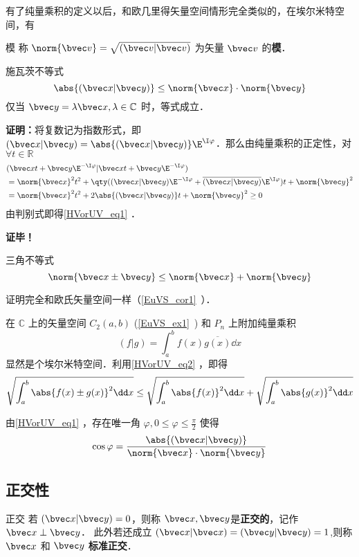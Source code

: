 有了纯量乘积的定义以后，和欧几里得矢量空间情形完全类似的，在埃尔米特空间，有
\begin{definition}{模}
称 $\norm{\bvec v}=\sqrt{(\bvec v|\bvec v)}$ 为矢量 $\bvec v$ 的\textbf{模}．
\end{definition} 
\begin{theorem}{施瓦茨不等式}
\begin{equation}\label{HVorUV_eq1}
\abs{(\bvec x|\bvec y)}\leq \norm{\bvec x}\cdot \norm{\bvec y}
\end{equation}
仅当 $\bvec y=\lambda\bvec x,\lambda\in\mathbb{C}$ 时，等式成立．
\end{theorem}
\textbf{证明：}将复数记为指数形式，即 $(\bvec x|\bvec y)=\abs{(\bvec x|\bvec y)}\E^{\I \varphi}$．那么由纯量乘积的正定性，对 $\forall t\in\mathbb{R}$
\begin{equation}
\begin{aligned}
&(\bvec x t+\bvec y\E^{-\I\varphi}|\bvec x t+\bvec y\E^{-\I\varphi})\\
&=\norm{\bvec x}^2t^2+\qty((\bvec x|\bvec y)\E^{-\I\varphi}+\overline{(\bvec x|\bvec y)}\E^{\I\varphi})t+\norm{\bvec y}^2\\
&=\norm{\bvec x}^2t^2+2\abs{(\bvec x|\bvec y)}t+\norm{\bvec y}^2\geq0
\end{aligned}
\end{equation}
由判别式即得\autoref{HVorUV_eq1} ．

\textbf{证毕！}
\begin{corollary}{三角不等式}
\begin{equation}\label{HVorUV_eq2}
\norm{\bvec x\pm\bvec y}\leq\norm{\bvec x}+\norm{\bvec y}
\end{equation}
\end{corollary}
证明完全和欧氏矢量空间一样（\autoref{EuVS_cor1}~）．
\begin{example}{}
在 $\mathbb{C}$ 上的矢量空间 $C_2(a,b)$ (\autoref{EuVS_ex1}~) 和 $P_n$ 上附加纯量乘积
\begin{equation}
(f|g)=\int_a^{b}f(x)\overline{g(x)}\dd x
\end{equation}
显然是个埃尔米特空间．利用\autoref{HVorUV_eq2} ，即得
\begin{equation}
\sqrt{\int_a^b\abs{f(x)\pm g(x)}^2\dd x}\leq\sqrt{\int_a^b\abs{f(x)}^2\dd x}+\sqrt{\int_a^b\abs{g(x)}^2\dd x}
\end{equation}
\end{example}
由\autoref{HVorUV_eq1} ，存在唯一角 $\varphi,0\leq\varphi\leq\frac{\pi}{2}$ 使得
\begin{equation}
\cos\varphi=\frac{\abs{(\bvec x|\bvec y)}}{\norm{\bvec x}\cdot \norm{\bvec y}}
\end{equation}
\subsection{正交性}
\begin{definition}{正交}
若 $(\bvec x|\bvec y)=0$，则称 $\bvec x,\bvec y$是\textbf{正交的}，记作 $\bvec x\perp\bvec y$．
此外若还成立 $(\bvec x|\bvec x)=(\bvec y|\bvec y)=1$,则称 $\bvec x$ 和 $\bvec y$ \textbf{标准正交}．
\end{definition}
